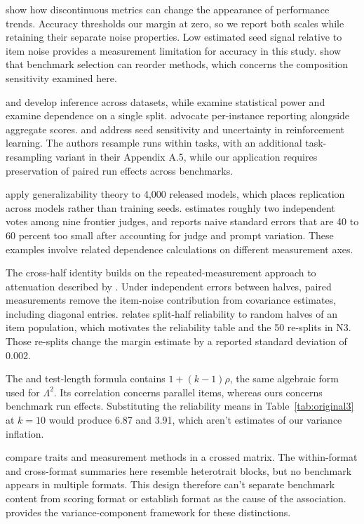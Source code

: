 \citet{schaeffer2023} show how discontinuous metrics can change the appearance of performance trends. Accuracy thresholds our margin at zero, so we report both scales while retaining their separate noise properties. Low estimated seed signal relative to item noise provides a measurement limitation for accuracy in this study. \citet{dehghani2021} show that benchmark selection can reorder methods, which concerns the composition sensitivity examined here.

\citet{demsar2006} and \citet{dror2017} develop inference across datasets, while \citet{card2020} examine statistical power and \citet{gorman2019} examine dependence on a single split. \citet{burnell2023} advocate per-instance reporting alongside aggregate scores. \citet{henderson2018} and \citet{agarwal2021} address seed sensitivity and uncertainty in reinforcement learning. The authors resample runs within tasks, with an additional task-resampling variant in their Appendix A.5, while our application requires preservation of paired run effects across benchmarks.

\citet{hardy2026} apply generalizability theory to 4,000 released models, which places replication across models rather than training seeds. \citet{kohli2026} estimates roughly two independent votes among nine frontier judges, and \citet{messing2026} reports naive standard errors that are 40 to 60 percent too small after accounting for judge and prompt variation. These examples involve related dependence calculations on different measurement axes.

The cross-half identity builds on the repeated-measurement approach to attenuation described by \citet{spearman1904}. Under independent errors between halves, paired measurements remove the item-noise contribution from covariance estimates, including diagonal entries. \citet{cronbach1951} relates split-half reliability to random halves of an item population, which motivates the reliability table and the 50 re-splits in N3. Those re-splits change the margin estimate by a reported standard deviation of 0.002.

The \citet{brown1910} and \citet{spearman1910} test-length formula contains $1+(k-1)\rho$, the same algebraic form used for $\Lambda^2$. Its correlation concerns parallel items, whereas ours concerns benchmark run effects. Substituting the reliability means in Table~\ref{tab:original3} at $k=10$ would produce 6.87 and 3.91, which aren't estimates of our variance inflation.

\citet{campbell1959} compare traits and measurement methods in a crossed matrix. The within-format and cross-format summaries here resemble heterotrait blocks, but no benchmark appears in multiple formats. This design therefore can't separate benchmark content from scoring format or establish format as the cause of the association. \citet{brennan2001} provides the variance-component framework for these distinctions.

